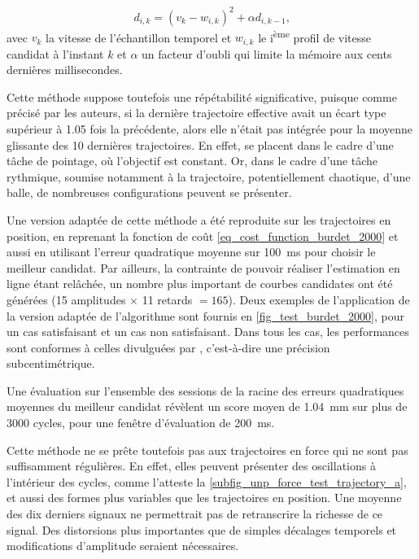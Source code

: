 \begin{equation} \label{eq_cost_function_burdet_2000}
	d_{i,k} = (v_k - w_{i,k})^2 + \alpha d_{i,k-1} \text{,}
\end{equation}
avec $v_k$ la vitesse de l'échantillon temporel et $w_{i,k}$ le i\textsuperscript{ème} profil de vitesse candidat à l'instant $k$ et $\alpha$ un facteur d'oubli qui limite la mémoire aux cents dernières millisecondes.

Cette méthode suppose toutefois une répétabilité significative, puisque comme précisé par les auteurs, si la dernière trajectoire effective avait un écart type supérieur à 1.05 fois la précédente, alors elle n'était pas intégrée pour la moyenne glissante des 10 dernières trajectoires. En effet, \textcite{burdet_method_2000} se placent dans le cadre d'une tâche de pointage, où l'objectif est constant. Or, dans le cadre d'une tâche rythmique, soumise notamment à la trajectoire, potentiellement chaotique, d'une balle, de nombreuses configurations peuvent se présenter.

Une version adaptée de cette méthode a été reproduite sur les trajectoires en position, en reprenant la fonction de coût \cref{eq_cost_function_burdet_2000} et aussi en utilisant l'erreur quadratique moyenne sur \SI{100}{\milli\second} pour choisir le meilleur candidat. Par ailleurs, la contrainte de pouvoir réaliser l'estimation en ligne étant relâchée, un nombre plus important de courbes candidates ont été générées (15 amplitudes $\times$ 11 retards $ = 165$). Deux exemples de l'application de la version adaptée de l'algorithme sont fournis en \cref{fig_test_burdet_2000}, pour un cas satisfaisant et un cas non satisfaisant. Dans tous les cas, les performances sont conformes à celles divulguées par \textcite{burdet_method_2000}, c'est-à-dire une précision subcentimétrique.

Une évaluation sur l'ensemble des sessions de la racine des erreurs quadratiques moyennes du meilleur candidat révèlent un score moyen de \SI{1.04}{\milli\meter} sur plus de 3000 cycles, pour une fenêtre d'évaluation de \SI{200}{\milli\second}.

Cette méthode ne se prête toutefois pas aux trajectoires en force qui ne sont pas suffisamment régulières. En effet, elles peuvent présenter des oscillations à l'intérieur des cycles, comme l'atteste la \cref{subfig_unp_force_test_trajectory_a}, et aussi des formes plus variables que les trajectoires en position. Une moyenne des dix derniers signaux ne permettrait pas de retranscrire la richesse de ce signal. Des distorsions plus importantes que de simples décalages temporels et modifications d'amplitude seraient nécessaires.

